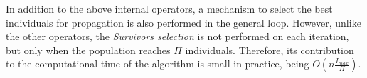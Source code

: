In addition to the above internal operators, a mechanism to select the best individuals for propagation is also performed in the general loop. However, unlike the other operators, the \textit{Survivors selection} is not performed on each iteration, but only when the population reaches $\Pi$ individuals. Therefore, its contribution to the computational time of the algorithm is small in practice, being $O(n\frac{I_{max}}{\Pi})$.